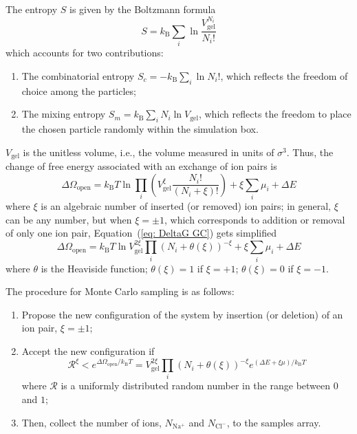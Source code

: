 \documentclass[gels,article,accept,pdftex,moreauthors]{Definitions/mdpi}
\newcommand{\ie}{{i.e.,} }
\newcommand{\kT}{k_\mathrm{B}T}
\newcommand{\kB}{k_\mathrm{B}}
\newcommand{\Nna}{N_\mathrm{Na^+}}
\newcommand{\Ncl}{N_\mathrm{Cl^-}}
\newcommand{\Vgel}{V_\mathrm{gel}}
\newcommand{\refeq}[1]{Equation~(\ref{#1}){}}
\begin{document}
The entropy $S$ is given by the Boltzmann formula~\cite{Nagle2004}
\begin{equation}
    S=\kB\sum_i\ln\frac{\Vgel^{N_i}}{N_i!}\label{eq:entropy}
\end{equation}
which accounts for two contributions:
\begin{enumerate}
    \item The combinatorial entropy $S_{c}=-\kB\sum_i\ln N_i!$, which reflects the freedom of choice among the particles;
    \item The mixing entropy $S_{m}=\kB \sum_i N_i\ln \Vgel$, which reflects the freedom to place the chosen particle randomly within the simulation box. 
\end{enumerate}

$\Vgel$ is the unitless volume, \ie the volume measured in units of $\sigma^3$. 
Thus, the change of free energy associated with an exchange of ion pairs is
\begin{equation}
\Delta\Omega_\mathrm{open}=\kT\ln\prod_i\left(\Vgel^{\xi}\frac{N_i!}{\left(N_i+\xi\right)!}\right)+\xi\sum_i\mu_i+\Delta E
\label{eq: DeltaG GC}
\end{equation}
where $\xi$ is an algebraic number of inserted (or removed) ion pairs; in general, $\xi$ can be any number, but when $\xi = \pm 1$, which corresponds to addition or removal of only one ion pair,  \refeq{eq: DeltaG GC} gets simplified
\begin{equation}
    \Delta\Omega_\mathrm{open}=\kT\ln \Vgel^{2\xi} \prod_i \left(N_i+\theta(\xi)\right)^{-\xi}+\xi\sum_i\mu_i+\Delta E
\label{eq: DeltaG GC_simpl}
\end{equation}
where $\theta$ is the Heaviside function; $\theta(\xi) = 1$ if $\xi=+1$; $\theta(\xi) = 0$ if $\xi=-1$.

The procedure for Monte Carlo sampling is as follows: \cite{Frenlkel2002_book}
\begin{enumerate}
	\item Propose the new configuration of the system by insertion (or deletion) of an ion pair, $\xi=\pm1$;
	\item Accept the new configuration if
	\begin{equation}
        \mathcal{R}^{\xi}<e^{\Delta\Omega_\mathrm{open}/\kT}=\Vgel^{2\xi} \prod_i \left(N_i+\theta(\xi)\right)^{-\xi}e^{\left(\Delta E+\xi\mu\right)/\kT}\label{eq: GC acceptance}
	\end{equation}
	where $\mathcal{R}$ is a uniformly distributed random number in the range between $0$ and $1$;
	\item Then, collect the number of ions, $\Nna$ and $\Ncl$, to the samples array.
\end{enumerate}
\end{document}
